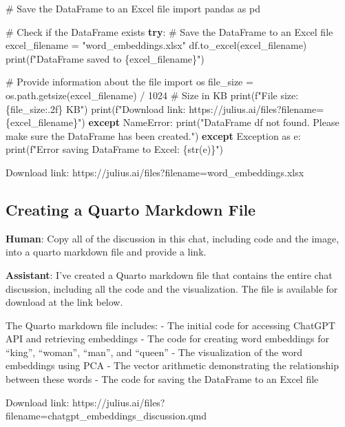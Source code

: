 \documentclass[
  letterpaper,
  DIV=11,
  numbers=noendperiod]{scrartcl}
\newenvironment{Shaded}{\begin{snugshade}}{\end{snugshade}}
\newcommand{\BuiltInTok}[1]{\textcolor[rgb]{0.00,0.23,0.31}{#1}}
\newcommand{\CommentTok}[1]{\textcolor[rgb]{0.37,0.37,0.37}{#1}}
\newcommand{\ControlFlowTok}[1]{\textcolor[rgb]{0.00,0.23,0.31}{\textbf{#1}}}
\newcommand{\DecValTok}[1]{\textcolor[rgb]{0.68,0.00,0.00}{#1}}
\newcommand{\ImportTok}[1]{\textcolor[rgb]{0.00,0.46,0.62}{#1}}
\newcommand{\NormalTok}[1]{\textcolor[rgb]{0.00,0.23,0.31}{#1}}
\newcommand{\OperatorTok}[1]{\textcolor[rgb]{0.37,0.37,0.37}{#1}}
\newcommand{\PreprocessorTok}[1]{\textcolor[rgb]{0.68,0.00,0.00}{#1}}
\newcommand{\SpecialCharTok}[1]{\textcolor[rgb]{0.37,0.37,0.37}{#1}}
\newcommand{\SpecialStringTok}[1]{\textcolor[rgb]{0.13,0.47,0.30}{#1}}
\newcommand{\StringTok}[1]{\textcolor[rgb]{0.13,0.47,0.30}{#1}}
\begin{document}
\begin{Shaded}
\begin{Highlighting}[]
\CommentTok{\# Save the DataFrame to an Excel file}
\ImportTok{import}\NormalTok{ pandas }\ImportTok{as}\NormalTok{ pd}

\CommentTok{\# Check if the DataFrame exists}
\ControlFlowTok{try}\NormalTok{:}
    \CommentTok{\# Save the DataFrame to an Excel file}
\NormalTok{    excel\_filename }\OperatorTok{=} \StringTok{"word\_embeddings.xlsx"}
\NormalTok{    df.to\_excel(excel\_filename)}
    \BuiltInTok{print}\NormalTok{(}\SpecialStringTok{f"DataFrame saved to }\SpecialCharTok{\{}\NormalTok{excel\_filename}\SpecialCharTok{\}}\SpecialStringTok{"}\NormalTok{)}
    
    \CommentTok{\# Provide information about the file}
    \ImportTok{import}\NormalTok{ os}
\NormalTok{    file\_size }\OperatorTok{=}\NormalTok{ os.path.getsize(excel\_filename) }\OperatorTok{/} \DecValTok{1024}  \CommentTok{\# Size in KB}
    \BuiltInTok{print}\NormalTok{(}\SpecialStringTok{f"File size: }\SpecialCharTok{\{}\NormalTok{file\_size}\SpecialCharTok{:.2f\}}\SpecialStringTok{ KB"}\NormalTok{)}
    \BuiltInTok{print}\NormalTok{(}\SpecialStringTok{f"Download link: https://julius.ai/files?filename=}\SpecialCharTok{\{}\NormalTok{excel\_filename}\SpecialCharTok{\}}\SpecialStringTok{"}\NormalTok{)}
\ControlFlowTok{except} \PreprocessorTok{NameError}\NormalTok{:}
    \BuiltInTok{print}\NormalTok{(}\StringTok{"DataFrame \textquotesingle{}df\textquotesingle{} not found. Please make sure the DataFrame has been created."}\NormalTok{)}
\ControlFlowTok{except} \PreprocessorTok{Exception} \ImportTok{as}\NormalTok{ e:}
    \BuiltInTok{print}\NormalTok{(}\SpecialStringTok{f"Error saving DataFrame to Excel: }\SpecialCharTok{\{}\BuiltInTok{str}\NormalTok{(e)}\SpecialCharTok{\}}\SpecialStringTok{"}\NormalTok{)}
\end{Highlighting}
\end{Shaded}

Download link: https://julius.ai/files?filename=word\_embeddings.xlsx

\subsection{Creating a Quarto Markdown
File}\label{creating-a-quarto-markdown-file}

\textbf{Human}: Copy all of the discussion in this chat, including code
and the image, into a quarto markdown file and provide a link.

\textbf{Assistant}: I've created a Quarto markdown file that contains
the entire chat discussion, including all the code and the
visualization. The file is available for download at the link below.

The Quarto markdown file includes: - The initial code for accessing
ChatGPT API and retrieving embeddings - The code for creating word
embeddings for ``king'', ``woman'', ``man'', and ``queen'' - The
visualization of the word embeddings using PCA - The vector arithmetic
demonstrating the relationship between these words - The code for saving
the DataFrame to an Excel file

Download link:
https://julius.ai/files?filename=chatgpt\_embeddings\_discussion.qmd
\end{document}
